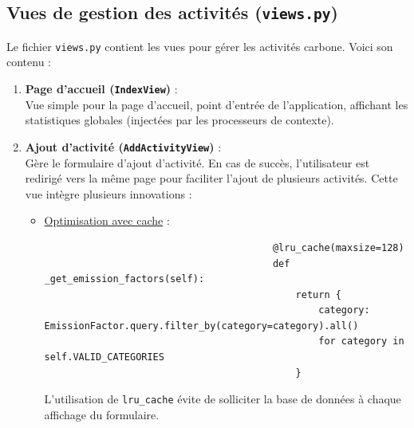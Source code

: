 \documentclass[a4paper,11pt]{article}
\begin{document}
            \subsection{Vues de gestion des activités (\texttt{views.py})}
                \noindent Le fichier \texttt{views.py} contient les vues pour gérer les activités carbone. Voici son contenu :

                

                \begin{enumerate}
                    \item \textbf{Page d'accueil (\texttt{IndexView})} :\\
                        Vue simple pour la page d'accueil, point d'entrée de l'application, affichant les statistiques globales (injectées par les processeurs de contexte).

                    \item \textbf{Ajout d'activité (\texttt{AddActivityView})} :\\
                        Gère le formulaire d'ajout d'activité. En cas de succès, l'utilisateur est redirigé vers la même page pour faciliter l'ajout de plusieurs activités. Cette vue intègre plusieurs innovations :

                        \begin{itemize}
                            \item \underline{Optimisation avec cache} :
                                \begin{tcolorbox}[colback=lightgray!6, colframe=black, left=-70mm, right=5mm, top=2mm, bottom=0mm, boxrule=0.1mm]
                                    \begin{verbatim}
                                        @lru_cache(maxsize=128)
                                        def _get_emission_factors(self):
                                            return {
                                                category: EmissionFactor.query.filter_by(category=category).all()
                                                for category in self.VALID_CATEGORIES
                                            }
                                    \end{verbatim}
                                \end{tcolorbox}
                                \noindent L'utilisation de \texttt{lru\_cache} évite de solliciter la base de données à chaque affichage du formulaire.


\end{itemize}
\end{enumerate}
\end{document}

